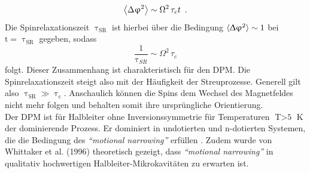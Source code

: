 \begin{equation}
\Braket{\Delta\upvarphi^2} \sim \Omega^2\,\tau_c t \,\text{ .}
\end{equation}
Die Spinrelaxationszeit $\uptau_\text{SR}$ ist hierbei über die Bedingung $\Braket{\Updelta\upvarphi^\text{2}} \sim \text{1}$ bei $\text{t}=\uptau_\text{SR}$ gegeben, sodass 
\begin{equation}
\frac{1}{\uptau_{SR}} \sim \Omega^2\, \tau_c
\end{equation}
folgt. Dieser Zusammenhang ist charakteristisch für den DPM. Die Spinrelaxationszeit steigt also mit der Häufigkeit der Streuprozesse. Generell gilt also $\uptau_\text{SR} \gg \uptau_\text{c}$.  Anschaulich können die Spins dem Wechsel des Magnetfeldes nicht mehr folgen und behalten somit ihre ursprüngliche Orientierung.\\
Der DPM ist für Halbleiter ohne Inversionssymmetrie für Temperaturen $\text{T}>\text{5}$ K der dominierende Prozess. Er dominiert in undotierten und n-dotierten Systemen, die die Bedingung des \textit{``motional narrowing''} erfüllen \cite{Zutic.2004}. Zudem wurde von Whittaker et al. (1996) \cite{Whittaker.1996} theoretisch gezeigt, dass \textit{``motional narrowing''} in qualitativ hochwertigen Halbleiter-Mikrokavitäten zu erwarten ist.

